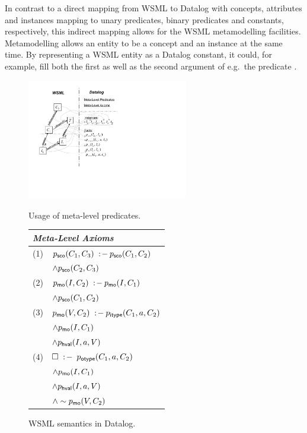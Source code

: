 In contrast to a direct mapping from WSML to Datalog with
concepts, attributes and instances mapping to unary predicates,
binary predicates and constants, respectively, this indirect
mapping allows for the WSML metamodelling facilities.
Metamodelling allows an entity to be a concept and an instance at
the same time. By representing a WSML entity as a Datalog
constant, it could, for example, fill both the first as well as
the second argument of e.g.\ the predicate \pmo.

\begin{figure}[tb]
\begin{minipage}[t]{6cm}
        \includegraphics[width=7cm]{figures/meta}
        \raggedleft
\caption{Usage of meta-level predicates. \label{fig:meta}}
\end{minipage}\hfill
\begin{minipage}[t]{4.7cm}
\begin{small}
\vspace{-5.5cm}
\begin{tabular}{|ll|}
  \hline
  \multicolumn{2}{|l|}{\rule{0cm}{3.2mm}{\normalsize \emph{Meta-Level Axioms}}} \\
  \hline
  (1) & $p_{\mathrm{\sf sco}}(C_1,C_3) \;:\!-\: p_{\mathrm{\sf sco}}(C_1,C_2)$ \\
      & \phantom{$\psco(C_1,C_3) \dlogrule$} $\wedge p_{\mathrm{\sf sco}}(C_2,C_3)$ \\
  (2) & $p_{\mathrm{\sf mo}}(I,C_2) \;:\!-\: p_{\mathrm{\sf mo}}(I,C_1)$ \\
      & \phantom{$\pmo(I,C_2) \dlogrule$} $\wedge p_{\mathrm{\sf sco}}(C_1,C_2)$ \\
  (3) & $p_{\mathrm{\sf mo}}(V,C_2) \;:\!-\: p_{\mathrm{\sf itype}}(C_1,a,C_2)$ \\
      & \phantom{$\pmo(V,C_2) \dlogrule$} $\wedge p_{\mathrm{\sf mo}}(I,C_1)$ \\
      & \phantom{$\pmo(V,C_2) \dlogrule$} $\wedge p_{\mathrm{\sf hval}}(I,a,V)$ \\
  (4) & $\square\;:\!-\: \; p_{\mathrm{\sf otype}}(C_1,a,C_2)$ \\
      & \phantom{$\dlogcstr \;$} $\wedge p_{\mathrm{\sf mo}}(I,C_1)$ \\
      & \phantom{$\dlogcstr \;$} $\wedge p_{\mathrm{\sf hval}}(I,a,V)$ \\
      & \phantom{$\dlogcstr \;$} $\wedge \sim p_{\mathrm{\sf mo}}(V,C_2)$ \\
 \hline
\end{tabular}
\caption{WSML semantics in Datalog. \label{tab:meta-level}}
\end{small}
\end{minipage}
\end{figure}

